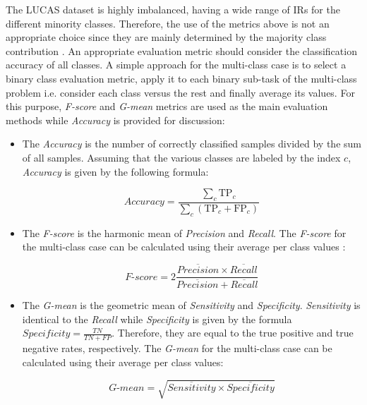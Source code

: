 \documentclass[remotesensing,article,submit,moreauthors,pdftex]{Definitions/mdpi}
\begin{document}
The LUCAS dataset is highly imbalanced, having a wide range of IRs for the
different minority classes. Therefore, the use of the metrics above is not an
appropriate choice since they are mainly determined by the majority class
contribution \cite{He2009}. An appropriate evaluation metric should consider the
classification accuracy of all classes. A simple approach for the multi-class
case is to select a binary class evaluation metric, apply it to each binary
sub-task of the multi-class problem i.e. consider each class versus the rest and
finally average its values. For this purpose, \textit{F-score} and
\textit{G-mean} metrics are used as the main evaluation methods while
\textit{Accuracy} is provided for discussion:

\begin{itemize}

	\renewcommand\labelitemi{--}

	\item The \textit{Accuracy} is the number of correctly classified
	      samples divided by the sum of all samples. Assuming that the various classes
	      are labeled by the index \( c \), \textit{Accuracy} is given by the
	      following formula:

	      $$\textit{Accuracy} = \frac{ \sum\limits_{c}{ \text{TP}_{c} } }{
			      \sum\limits_{c}{ (\text{TP}_{c}  + \text{FP}_{c}) } } $$

	\item The \textit{F-score} is the harmonic mean of \textit{Precision} and
	      \textit{Recall}. The \textit{F-score} for the multi-class case can be
	      calculated using their average per class values \cite{He2009}:

	      $$\textit{F-score}=2\frac{\overline{Precision} \times \overline{Recall}}{\overline{Precision} +
			      \overline{Recall}}$$

	\item The \textit{G-mean} is the geometric mean of \textit{Sensitivity} and
	      \textit{Specificity}. \textit{Sensitivity} is identical to the
	      \textit{Recall} while \textit{Specificity} is given by the formula
	      \(\textit{Specificity} =  \frac{TN}{TN + FP} \). Therefore, they are equal
	      to the true positive and true negative rates, respectively. The
	      \textit{G-mean} for the multi-class case can be calculated using their
	      average per class values:

	      $$\textit{G-mean} = \sqrt{ \overline{Sensitivity} \times
			      \overline{Specificity}}$$

\end{itemize}
\end{document}
